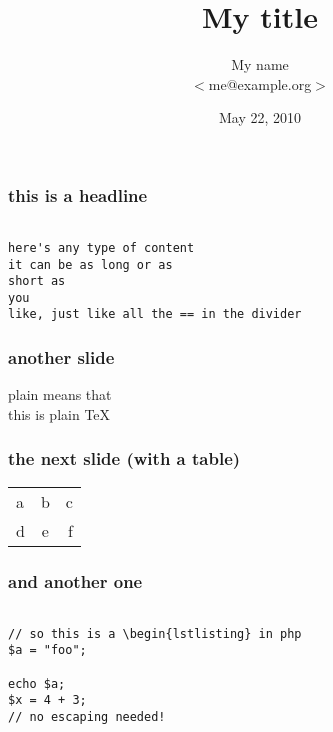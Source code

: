 \documentclass{beamer}
\title[My title]{My title}
\author{My name \\$<$me@example.org$>$}
\institute{http://www.example.org}
\date{May 22, 2010}
\begin{document}
\begin{frame}
\titlepage
\end{frame}

\begin{frame}[fragile]
\frametitle{this is a headline}
\begin{lstlisting}

here's any type of content
it can be as long or as
short as
you
like, just like all the == in the divider

\end{lstlisting}
\end{frame}

\begin{frame}[fragile]
\frametitle{another slide}

plain means that \\
this is plain \TeX

\end{frame}

\begin{frame}[fragile]
\frametitle{the next slide (with a table)}
\begin{tabular}{ l c r }

a & b & c \\
d & e & f \\

\end{tabular}
\end{frame}

\begin{frame}[fragile]
\frametitle{and another one}
\lstset{language=php}
\begin{lstlisting}

// so this is a \begin{lstlisting} in php
$a = "foo";

echo $a;
$x = 4 + 3;
// no escaping needed!

\end{lstlisting}
\end{frame}
\end{document}
